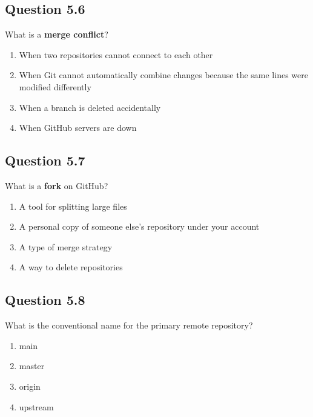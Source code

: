 \documentclass[
  letterpaper,
  DIV=11,
  numbers=noendperiod]{scrreprt}
\providecommand{\tightlist}{%
  \setlength{\itemsep}{0pt}\setlength{\parskip}{0pt}}
\begin{document}
\subsection{Question 5.6}\label{question-5.6}

What is a \textbf{merge conflict}?

\begin{enumerate}
\def\labelenumi{\Alph{enumi})}
\tightlist
\item
  When two repositories cannot connect to each other\\
\item
  When Git cannot automatically combine changes because the same lines
  were modified differently\\
\item
  When a branch is deleted accidentally\\
\item
  When GitHub servers are down
\end{enumerate}

\subsection{Question 5.7}\label{question-5.7}

What is a \textbf{fork} on GitHub?

\begin{enumerate}
\def\labelenumi{\Alph{enumi})}
\tightlist
\item
  A tool for splitting large files\\
\item
  A personal copy of someone else's repository under your account\\
\item
  A type of merge strategy\\
\item
  A way to delete repositories
\end{enumerate}

\subsection{Question 5.8}\label{question-5.8}

What is the conventional name for the primary remote repository?

\begin{enumerate}
\def\labelenumi{\Alph{enumi})}
\tightlist
\item
  main\\
\item
  master\\
\item
  origin\\
\item
  upstream
\end{enumerate}
\end{document}
